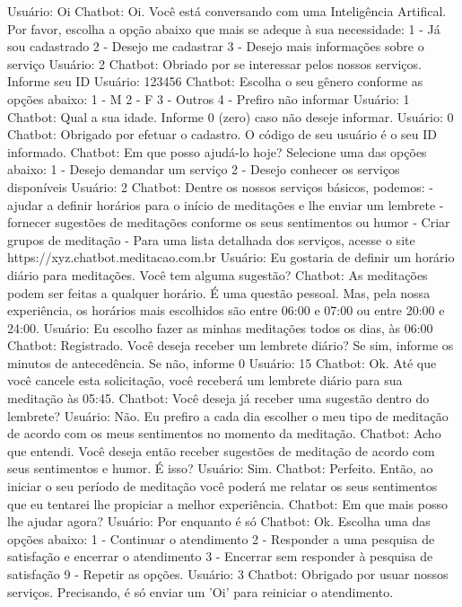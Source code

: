 Usuário:	Oi
Chatbot:	Oi. Você está conversando com uma Inteligência Artifical. Por favor, escolha a opção abaixo que mais se adeque à sua necessidade:  1 - Já sou cadastrado 2 - Desejo me cadastrar 3 - Desejo mais informações sobre o serviço
Usuário:	2
Chatbot:	Obriado por se interessar pelos nossos serviços. Informe seu ID
Usuário:	123456
Chatbot:	Escolha o seu gênero conforme as opções abaixo: 1 - M 2 - F 3 - Outros 4 - Prefiro não informar
Usuário:	1
Chatbot:	Qual a sua idade. Informe 0 (zero) caso não deseje informar.
Usuário:	0
Chatbot:	Obrigado por efetuar o cadastro. O código de seu usuário é o seu ID informado.
Chatbot:	Em que posso ajudá-lo hoje? Selecione uma das opções abaixo: 1 - Desejo demandar um serviço 2 - Desejo conhecer os serviços disponíveis
Usuário:	2
Chatbot:	Dentre os nossos serviços básicos, podemos: - ajudar a definir horários para o início de meditações e lhe enviar um lembrete - fornecer sugestões de meditações conforme os seus sentimentos ou humor - Criar grupos de meditação - Para uma lista detalhada dos serviços, acesse o site https://xyz.chatbot.meditacao.com.br
Usuário:	Eu gostaria de definir um horário diário para meditações. Você tem alguma sugestão?
Chatbot:	As meditações podem ser feitas a qualquer horário. É uma questão pessoal. Mas, pela nossa experiência, os horários mais escolhidos são entre 06:00 e 07:00 ou entre 20:00 e 24:00.
Usuário:	Eu escolho fazer as minhas meditações todos os dias, às 06:00
Chatbot:	Registrado. Você deseja receber um lembrete diário? Se sim, informe os minutos de antecedência. Se não, informe 0
Usuário:	15
Chatbot:	Ok. Até que você cancele esta solicitação, você receberá um lembrete diário para sua meditação às 05:45.
Chatbot:	Você deseja já receber uma sugestão dentro do lembrete?
Usuário:	Não. Eu prefiro a cada dia escolher o meu tipo de meditação de acordo com os meus sentimentos no momento da meditação.
Chatbot:	Acho que entendi. Você deseja então receber sugestões de meditação de acordo com seus sentimentos e humor. É isso?
Usuário:	Sim.
Chatbot:	Perfeito. Então, ao iniciar o seu período de meditação você poderá me relatar os seus sentimentos que eu tentarei lhe propiciar a melhor experiência.
Chatbot:	Em que mais posso lhe ajudar agora?
Usuário:	Por enquanto é só
Chatbot:	Ok. Escolha uma das opções abaixo: 1 - Continuar o atendimento 2 - Responder a uma pesquisa de satisfação e encerrar o atendimento 3 - Encerrar sem responder à pesquisa de satisfação 9  - Repetir as opções.
Usuário:	3
Chatbot:	Obrigado por usuar nossos serviços. Precisando, é só enviar um 'Oi' para reiniciar o atendimento.
